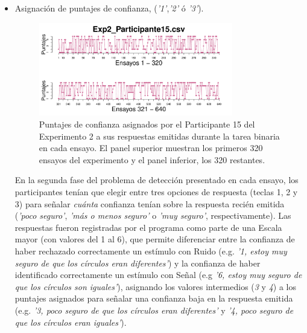\begin{itemize}

	\item Asignación de puntajes de confianza, (\textit{'1'},\textit{'2'} ó \textit{'3'}).

\begin{figure}[th]
\centering
\includegraphics[width=0.80\textwidth]{Figures/Rating_Exp2_P15} 
\decoRule
\caption[Explorando datos individuales (ejemplo): Puntaje de confianza emitido por cada ensayo]{Puntajes de confianza asignados por el Participante 15 del Experimento 2 a sus respuestas emitidas durante la tarea binaria en cada ensayo. El panel superior muestran los primeros 320 ensayos del experimento y el panel inferior, los 320 restantes.}
\label{fig:Rating_E2_P4}
\end{figure}


En la segunda fase del problema de detección presentado en cada ensayo, los participantes tenían que elegir entre tres opciones de respuesta (teclas 1, 2 y 3) para señalar \textit{cuánta} confianza tenían sobre la respuesta recién emitida (\textit{'poco seguro'}, \textit{'más o menos seguro'} o \textit{'muy seguro'}, respectivamente). Las respuestas fueron registradas por el programa como parte de una Escala mayor (con valores del 1 al 6), que permite diferenciar entre la confianza de haber rechazado correctamente un estímulo con Ruido (e.g. \textit{'1, estoy muy seguro de que los círculos eran diferentes'}) y la confianza de haber identificado correctamente un estímulo con Señal (e.g \textit{'6, estoy muy seguro de que los círculos son iguales'}), asignando los valores intermedios (\textit{3} y \textit{4}) a los puntajes asignados para señalar una confianza baja en la respuesta emitida (e.g. \textit{'3, poco seguro de que los círculos eran diferentes'} y \textit{'4, poco seguro de que los círculos eran iguales'}).\\


\end{itemize}
